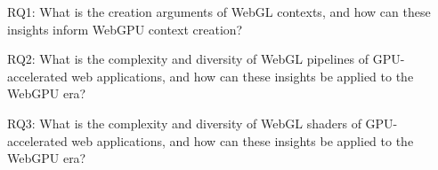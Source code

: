 RQ1: What is the creation arguments of WebGL contexts, and how can these insights inform WebGPU context creation?

RQ2: What is the complexity and diversity of WebGL pipelines of GPU-accelerated web applications, and how can these insights be applied to the WebGPU era?

RQ3: What is the complexity and diversity of WebGL shaders of GPU-accelerated web applications, and how can these insights be applied to the WebGPU era?
